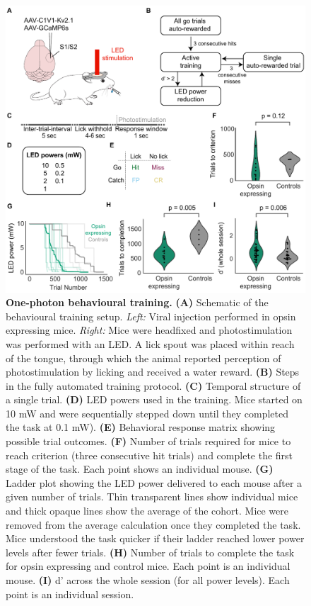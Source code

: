\begin{figure}[h]
\includegraphics[scale=0.75]{figures/1-photon-behaviour.pdf}
\caption[\textbf{One-photon behavioural training.}]{
\textbf{One-photon behavioural training.}
\textbf{(A)} Schematic of the behavioural training setup. \textit{Left:} Viral injection performed in opsin expressing mice. \textit{Right:} Mice were headfixed and photostimulation was performed with an LED. A lick spout was placed within reach of the tongue, through which the animal reported perception of photostimulation by licking and received a water reward. \textbf{(B)} Steps in the fully automated training protocol. \textbf{(C)} Temporal structure of a single trial.  \textbf{(D)} LED powers used in the training. Mice started on 10 mW and were sequentially stepped down until they completed the task at 0.1 mW).  \textbf{(E)} Behavioral response matrix showing possible trial outcomes. \textbf{(F)} Number of trials required for mice to reach criterion (three consecutive hit trials) and complete the first stage of the task. Each point shows an individual mouse. \textbf{(G)} Ladder plot showing the LED power delivered to each mouse after a given number of trials. Thin transparent lines show individual mice and thick opaque lines show the average of the cohort. Mice were removed from the average calculation once they completed the task. Mice understood the task quicker if their ladder reached lower power levels after fewer trials. \textbf{(H)} Number of trials to complete the task for opsin expressing and control mice. Each point is an individual mouse. \textbf{(I)} d' across the whole session (for all power levels). Each point is an individual session.
} 
\label{fig:1-photon-behaviour}
\end{figure}

